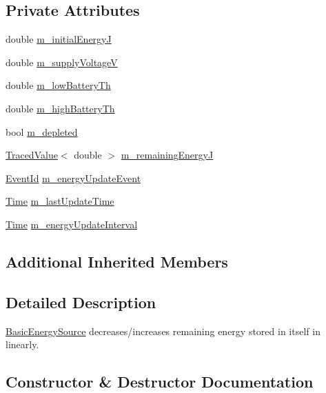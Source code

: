 \subsection*{Private Attributes}
\begin{DoxyCompactItemize}
\item 
double \hyperlink{classns3_1_1BasicEnergySource_a5fc07745738edfed7bdda2093671ee79}{m\+\_\+initial\+EnergyJ}
\item 
double \hyperlink{classns3_1_1BasicEnergySource_aef36736600c87d25637b0aebd140221f}{m\+\_\+supply\+VoltageV}
\item 
double \hyperlink{classns3_1_1BasicEnergySource_a69b07f157ebfc2d44aab53ebacf6fc95}{m\+\_\+low\+Battery\+Th}
\item 
double \hyperlink{classns3_1_1BasicEnergySource_ad4fe0a077e4695ea2b5ca1aa82b7e0be}{m\+\_\+high\+Battery\+Th}
\item 
bool \hyperlink{classns3_1_1BasicEnergySource_ad0031e2dcecc55c1a0ee133d7ffc3099}{m\+\_\+depleted}
\item 
\hyperlink{classns3_1_1TracedValue}{Traced\+Value}$<$ double $>$ \hyperlink{classns3_1_1BasicEnergySource_abf17a7a388b23d98fa67944a25d55c40}{m\+\_\+remaining\+EnergyJ}
\item 
\hyperlink{classns3_1_1EventId}{Event\+Id} \hyperlink{classns3_1_1BasicEnergySource_a9f535343c790a1b5952fd22532f61455}{m\+\_\+energy\+Update\+Event}
\item 
\hyperlink{classns3_1_1Time}{Time} \hyperlink{classns3_1_1BasicEnergySource_a758141d464a971755f0a1b563597a043}{m\+\_\+last\+Update\+Time}
\item 
\hyperlink{classns3_1_1Time}{Time} \hyperlink{classns3_1_1BasicEnergySource_a5a656471b01840459aab98e63295647e}{m\+\_\+energy\+Update\+Interval}
\end{DoxyCompactItemize}
\subsection*{Additional Inherited Members}


\subsection{Detailed Description}
\hyperlink{classns3_1_1BasicEnergySource}{Basic\+Energy\+Source} decreases/increases remaining energy stored in itself in linearly. 

\subsection{Constructor \& Destructor Documentation}
